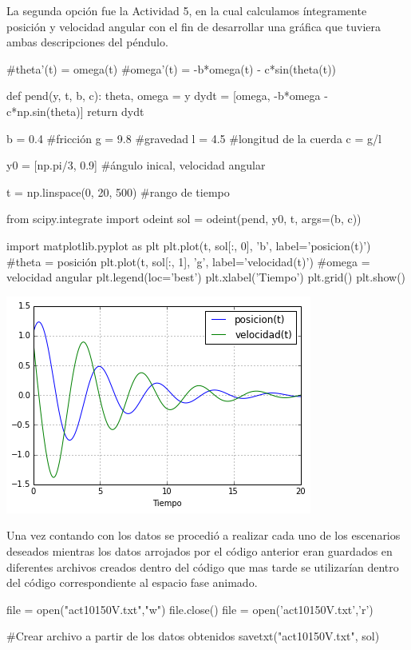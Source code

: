 \documentclass[12pt]{article}
\begin{document}
La segunda opción fue la Actividad 5, en la cual calculamos íntegramente posición y velocidad angular con el fin de desarrollar una gráfica que tuviera ambas descripciones del péndulo.\\

\begin{boxedverbatim}
#theta'(t) = omega(t)
#omega'(t) = -b*omega(t) - c*sin(theta(t))

def pend(y, t, b, c):
     theta, omega = y
     dydt = [omega, -b*omega - c*np.sin(theta)]
     return dydt

b = 0.4 #fricción
g = 9.8 #gravedad
l = 4.5 #longitud de la cuerda
c = g/l

y0 = [np.pi/3, 0.9] #ángulo inical, velocidad angular

t = np.linspace(0, 20, 500) #rango de tiempo

from scipy.integrate import odeint
sol = odeint(pend, y0, t, args=(b, c))

import matplotlib.pyplot as plt
plt.plot(t, sol[:, 0], 'b', label='posicion(t)') 
#theta = posición
plt.plot(t, sol[:, 1], 'g', label='velocidad(t)')
#omega = velocidad angular
plt.legend(loc='best')
plt.xlabel('Tiempo')
plt.grid()
plt.show()
\end{boxedverbatim}


\includegraphics{Act102.png}

Una vez contando con los datos se procedió a realizar cada uno de los escenarios deseados mientras los datos arrojados por el código anterior eran guardados en diferentes archivos creados dentro del código que mas tarde se utilizarían dentro del código correspondiente al espacio fase animado.\\

\begin{boxedverbatim}
file = open("act10150V.txt","w")
file.close()
file = open('act10150V.txt','r')

#Crear archivo a partir de los datos obtenidos
savetxt("act10150V.txt", sol)
\end{boxedverbatim}
\\
\end{document}
